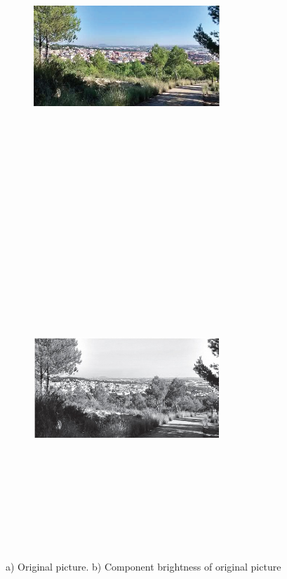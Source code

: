 \begin{figure}
	\begin{subfigure}{7cm}  
    	\includegraphics[width=7cm,height=12cm,keepaspectratio]{images/ch2/image.jpg}
    \end{subfigure}
  	\begin{subfigure}{5cm}
  		\includegraphics[width=7cm,height=12cm,keepaspectratio]{images/ch2/brightness.jpg}
   
  	\end{subfigure}
  	\caption{a) Original picture. b) Component brightness of original picture}
  	\label{fig:image}
\end{figure}


